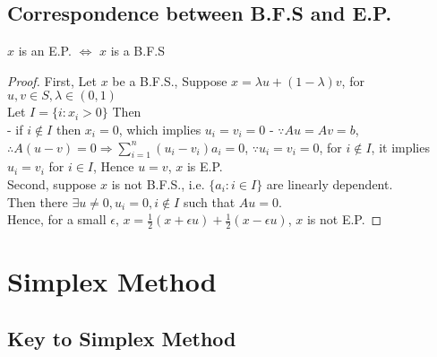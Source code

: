 			\subsection{Correspondence between B.F.S and E.P.}
				\begin{theorem}
					$x$ is an E.P. $\iff$ $x$ is a B.F.S
				\end{theorem}
				
				\begin{proof}
					First, Let $x$ be a B.F.S., Suppose $x=\lambda u + (1 - \lambda) v$, for $u, v \in S, \lambda \in (0, 1)$\\
					Let $I = \{i: x_i > 0\}$ Then\\
					- if $i \notin I$ then $x_i = 0$, which implies $u_i = v_i = 0$
					- $\because Au = Av = b$, $\therefore A(u-v) = 0 \Rightarrow \sum_{i=1}^n(u_i - v_i)a_i = 0$, $\because u_i = v_i = 0$, for $i\notin I$, it implies $u_i = v_i$ for $i\in I$, Hence $u=v$, $x$ is E.P.\\
					Second, suppose $x$ is not B.F.S., i.e. $\{a_i: i \in I\}$ are linearly dependent.\\
					Then there $\exists u\ne 0, u_i =0 , i\notin I$ such that $Au=0$.\\
					Hence, for a small $\epsilon$, $x=\frac12(x + \epsilon u) + \frac12(x - \epsilon u)$, $x$ is not E.P.					
				\end{proof}

		\section{Simplex Method}
			\subsection{Key to Simplex Method}
